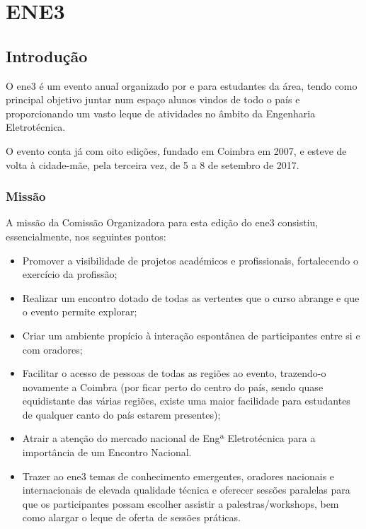 
\section{ENE3}

\subsection{Introdução}

O \acrfull{ene3} é um evento anual organizado por e para estudantes da área, tendo como principal objetivo juntar num espaço alunos vindos de todo o país e proporcionando um vasto leque de atividades no âmbito da Engenharia Eletrotécnica.

O evento conta já com oito edições, fundado em Coimbra em 2007, e esteve de volta à cidade-mãe, pela terceira vez, de 5 a 8 de setembro de 2017.

\subsubsection{Missão}

A missão da Comissão Organizadora para esta edição do \acrshort{ene3} consistiu, essencialmente, nos seguintes pontos:
\begin{itemize}
\item Promover a visibilidade de projetos académicos e profissionais, fortalecendo o exercício da profissão;
\item Realizar um encontro dotado de todas as vertentes que o curso abrange e que o evento permite explorar;
\item Criar um ambiente propício à interação espontânea de participantes entre si e com oradores;
\item Facilitar o acesso de pessoas de todas as regiões ao evento, trazendo-o novamente a Coimbra (por ficar perto do centro do país, sendo quase equidistante das várias regiões, existe uma maior facilidade para estudantes de qualquer canto do país estarem presentes);
\item Atrair a atenção do mercado nacional de Engª Eletrotécnica para a importância de um Encontro Nacional.
\item Trazer ao \acrshort{ene3} temas de conhecimento emergentes, oradores nacionais e internacionais de elevada qualidade técnica e oferecer sessões paralelas para que os participantes possam escolher assistir a palestras/workshops, bem como alargar o leque de oferta de sessões práticas.
\end{itemize}

